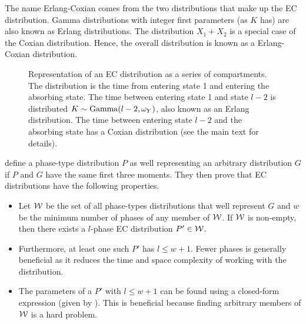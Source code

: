 \documentclass[thesis.tex]{subfiles}
\begin{document}
The name Erlang-Coxian comes from the two distributions that make up the EC distribution.
Gamma distributions with integer first parameters (as $K$ has) are also known as Erlang distributions.
The distribution $X_1 + X_2$ is a special case of the Coxian distribution.
Hence, the overall distribution is known as a Erlang-Coxian distribution.

\begin{figure}
\caption[A $l$ phase EC distribution.]{Representation of an EC distribution as a series of compartments. The distribution is the time from entering state 1 and entering the absorbing state. The time between entering state 1 and state $l-2$ is distributed $K \sim \operatorname{Gamma}(l-2, \omega_Y)$, also known as an Erlang distribution. The time between entering state $l-2$ and the absorbing state has a Coxian distribution (see the main text for details).}
\label{SEIR:fig:EC}
\end{figure}

\Textcite{osogamiClosed} define a phase-type distribution $P$ as well representing an arbitrary distribution $G$ if $P$ and $G$ have the same first three moments.
They then prove that EC distributions have the following properties.
\begin{itemize}
    \item Let $\mathcal{W}$ be the set of all phase-types distributions that well represent $G$ and $w$ be the minimum number of phases of any member of $\mathcal{W}$. If $\mathcal{W}$ is non-empty, then there exists a $l$-phase EC distribution $P' \in \mathcal{W}$.
    \item Furthermore, at least one such $P'$ has $l \leq w + 1$. Fewer phases is generally beneficial as it reduces the time and space complexity of working with the distribution.
    \item The parameters of a $P'$ with $l \leq w + 1$ can be found using a closed-form expression (given by \textcite{osogamiClosed}). This is beneficial because finding arbitrary members of $\mathcal{W}$ is a hard problem.
\end{itemize}
\end{document}
